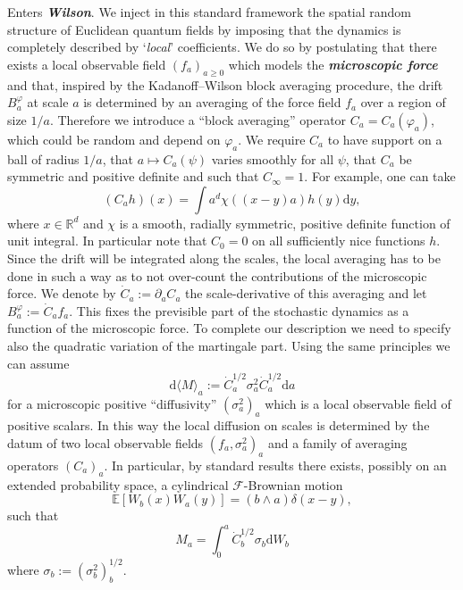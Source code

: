 \documentclass[reprint,aps]{revtex4-2}
\newcommand{\assign}{:=}
\newcommand{\mathd}{\mathrm{d}}
\newcommand{\tmtextbf}[1]{\textbf{{{#1}}}}
\newcommand{\tmtextit}[1]{\textit{{{#1}}}}
\begin{document}
Enters \tmtextbf{\tmtextit{Wilson}}. We inject in this standard framework the
spatial random structure of Euclidean quantum fields by imposing that the
dynamics is completely described by `\tmtextit{local}' coefficients. We do so
by postulating that there exists a local observable field $(f_a)_{a \geqslant
0}$ which models the \tmtextbf{\tmtextit{microscopic force}} and that,
inspired by the Kadanoff--Wilson block averaging procedure, the drift
$B^{\varphi}_a$ at scale $a$ is determined by an averaging of the force field
$f_a$ over a region of size $1 / a$. Therefore we introduce a ``block
averaging'' operator $C_a = C_a (\varphi_a)$, which could be random and depend
on $\varphi_a$. We require $C_a$ to have support on a ball of radius $1 / a$,
that $a \mapsto C_a (\psi)$ varies smoothly for all $\psi$, that $C_a$ be
symmetric and positive definite and such that $C_{\infty} = 1$. For example,
one can take
\begin{equation}
  (C_a h) (x) = \int a^d \chi ((x - y) a) h (y) \mathd y,
  \label{eq:main-averaging}
\end{equation}
where $x \in \mathbb{R}^d$ and $\chi$ is a smooth, radially symmetric,
positive definite function of unit integral. In particular note that $C_0 = 0$
on all sufficiently nice functions $h$. Since the drift will be integrated
along the scales, the local averaging has to be done in such a way as to not
over-count the contributions of the microscopic force. We denote by $\dot{C}_a
\assign \partial_a C_a$ the scale-derivative of this averaging and let
$B^{\varphi}_a \assign \dot{C}_a f_a$. This fixes the previsible part of the
stochastic dynamics as a function of the microscopic force. To complete our
description we need to specify also the quadratic variation of the martingale
part. Using the same principles we can assume
\[ \mathd \langle M \rangle_a \assign \dot{C}^{1 / 2}_a \sigma^2_a 
   \dot{C}^{1 / 2}_a \mathd a \]
for a microscopic positive ``diffusivity'' $(\sigma^2_a)_a$ which is a local
observable field of positive scalars. In this way the local diffusion on
scales is determined by the datum of two local observable fields $(f_a,
\sigma^2_a)_a$ and a family of averaging operators $(C_a)_a$. In particular,
by standard results there exists, possibly on an extended probability space, a
cylindrical $\mathscr{F}$-Brownian motion
\[ \mathbb{E} [W_b (x) W_a (y)] = (b \wedge a) \delta (x - y), \]
such that
\[ M_a = \int_0^a \dot{C}^{1 / 2}_b \sigma_b \mathd W_b \]
where $\sigma_b \assign (\sigma^2_b)^{1 / 2}_b$.
\end{document}
